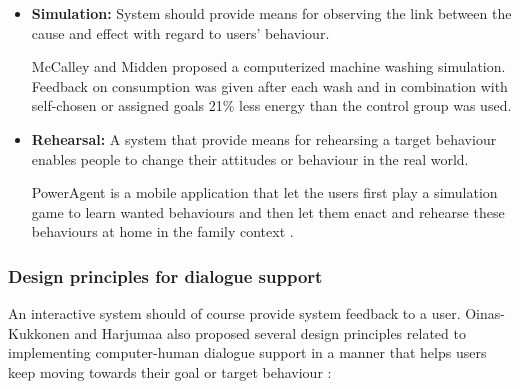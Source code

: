 \begin{itemize}
	\item \textbf{Simulation:}
	System should provide means for observing the link between the cause and effect with regard to users’ behaviour.
	
	McCalley and Midden \cite{mccalley2002energy} proposed a computerized	machine washing	simulation. Feedback on consumption was given after	each wash and in combination with self-chosen or assigned goals 21\% less energy than the control group was used.
		
	\item \textbf{Rehearsal:}
	A system that provide means for rehearsing a target behaviour enables people to change their attitudes or behaviour in the real world.
	
	PowerAgent is a mobile application that let the users first play a simulation game to learn wanted behaviours and then let them enact and rehearse these behaviours at home in the family context \cite{bang2007promoting}.
\end{itemize}


\subsubsection{Design principles for dialogue support}

An interactive system should of course provide system feedback to a user. Oinas-Kukkonen and Harjumaa also proposed several design principles related to implementing computer-human dialogue support in a manner that helps users keep moving towards their goal or target behaviour \cite{oinas2009persuasive}:

